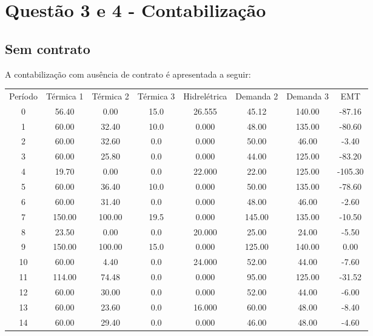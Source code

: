 \documentclass[a4paper,12pt,twoside]{article}
\begin{document}
\newpage

\section{Questão 3 e 4 - Contabilização}
\subsection{Sem contrato}
A contabilização com ausência de contrato é apresentada a seguir:

\begin{center}
    \begin{tabular}{ c c c c c c c c }
        Período & Térmica 1  & Térmica 2  & Térmica 3  & Hidrelétrica  & Demanda 2  & Demanda 3      & EMT \\
        0    & 56.40     & 0.00     & 15.0  & 26.555   & 45.12  & 140.00  & -87.16 \\
        1    & 60.00    & 32.40     & 10.0   & 0.000   & 48.00  & 135.00  & -80.60 \\
        2    & 60.00    & 32.60      & 0.0   & 0.000   & 50.00   & 46.00   & -3.40 \\
        3    & 60.00    & 25.80      & 0.0   & 0.000   & 44.00  & 125.00  & -83.20 \\
        4    & 19.70     & 0.00      & 0.0  & 22.000   & 22.00  & 125.00 & -105.30 \\
        5    & 60.00    & 36.40     & 10.0   & 0.000   & 50.00  & 135.00  & -78.60 \\
        6    & 60.00    & 31.40      & 0.0   & 0.000   & 48.00   & 46.00   & -2.60 \\
        7   & 150.00   & 100.00     & 19.5   & 0.000  & 145.00  & 135.00  & -10.50 \\
        8    & 23.50     & 0.00      & 0.0  & 20.000   & 25.00   & 24.00   & -5.50 \\
        9   & 150.00   & 100.00     & 15.0   & 0.000  & 125.00  & 140.00    & 0.00 \\
        10   & 60.00     & 4.40      & 0.0  & 24.000   & 52.00   & 44.00   & -7.60 \\
        11  & 114.00    & 74.48      & 0.0   & 0.000   & 95.00  & 125.00  & -31.52 \\
        12   & 60.00    & 30.00      & 0.0   & 0.000   & 52.00   & 44.00   & -6.00 \\
        13   & 60.00    & 23.60      & 0.0  & 16.000   & 60.00   & 48.00   & -8.40 \\
        14   & 60.00    & 29.40      & 0.0   & 0.000   & 46.00   & 48.00   & -4.60 \\

\end{tabular}
\end{center}
\end{document}

